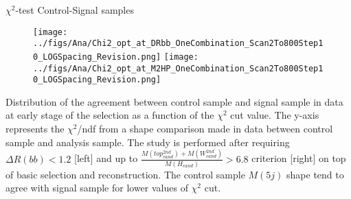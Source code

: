 \begin{frame}{$\chi^{2}$-test Control-Signal samples}
\vspace{-.2cm}
\begin{figure}[!Hhtbp]
  \begin{center}
    \texttt{[image: ../figs/Ana/Chi2\_opt\_at\_DRbb\_OneCombination\_Scan2To800Step10\_LOGSpacing\_Revision.png]} %
    \texttt{[image: ../figs/Ana/Chi2\_opt\_at\_M2HP\_OneCombination\_Scan2To800Step10\_LOGSpacing\_Revision.png]}
  \end{center}
\end{figure}

\vspace{-.2cm}
    \begin{block}{}
      \tiny \centering Distribution of the agreement between control sample and signal sample in data at early stage of the selection as a function of the $\chi^2$ cut value. The y-axis represents the $\chi^{2}$/ndf from a shape comparison made in data between control sample and analysis sample. The study is performed after requiring $\Delta R(bb) <1.2$ [left] and up to $\frac{M(top^{2nd}_{cand})+M(W^{2nd}_{cand})}{M(H_{cand})}>6.8$ criterion [right] on top of basic selection and reconstruction. The control sample $M(5j)$ shape tend to agree with signal sample for lower values of $\chi^2$ cut.
    \end{block}

\end{frame}


